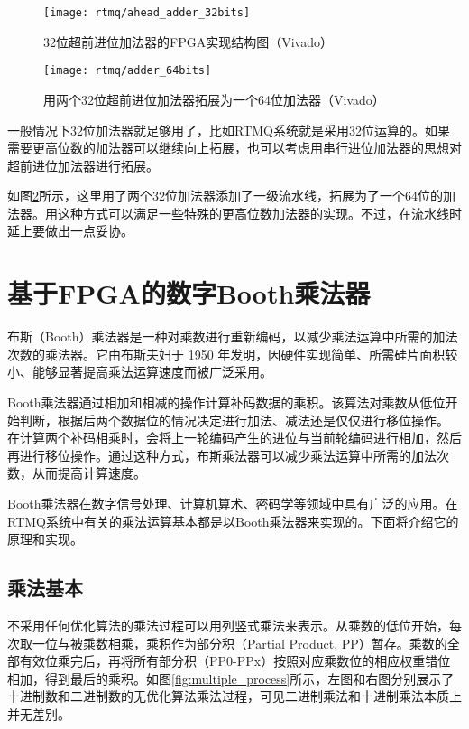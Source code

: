\begin{figure}
    \centering
    \caption[32位超前进位加法器的FPGA实现结构图]{32位超前进位加法器的FPGA实现结构图（Vivado）\label{fig:ahead_adder_32bits}}
    \texttt{[image: rtmq/ahead\_adder\_32bits]}
\end{figure}
\begin{figure}
    \centering
    \caption[用两个32位超前进位加法器拓展为一个64位加法器]{用两个32位超前进位加法器拓展为一个64位加法器（Vivado）\label{fig:adder_64bits}}
    \texttt{[image: rtmq/adder\_64bits]}
\end{figure}

一般情况下32位加法器就足够用了，比如RTMQ系统就是采用32位运算的。如果需要更高位数的加法器可以继续向上拓展，也可以考虑用串行进位加法器的思想对超前进位加法器进行拓展。

如图\ref{fig:adder_64bits}所示，这里用了两个32位加法器添加了一级流水线，拓展为了一个64位的加法器。用这种方式可以满足一些特殊的更高位数加法器的实现。不过，在流水线时延上要做出一点妥协。







\section[基于FPGA的数字Booth乘法器]{基于FPGA的数字Booth乘法器\label{section:booth_multiplier}}
布斯（Booth）乘法器是一种对乘数进行重新编码，以减少乘法运算中所需的加法次数的乘法器。它由布斯夫妇于 1950 年发明，因硬件实现简单、所需硅片面积较小、能够显著提高乘法运算速度而被广泛采用。

Booth乘法器通过相加和相减的操作计算补码数据的乘积。该算法对乘数从低位开始判断，根据后两个数据位的情况决定进行加法、减法还是仅仅进行移位操作。
在计算两个补码相乘时，会将上一轮编码产生的进位与当前轮编码进行相加，然后再进行移位操作。通过这种方式，布斯乘法器可以减少乘法运算中所需的加法次数，从而提高计算速度。

Booth乘法器在数字信号处理、计算机算术、密码学等领域中具有广泛的应用\cite[]{Jigjidsuren_Badarch_Sukhbaatar_Namsrai_2021}。在RTMQ系统中有关的乘法运算基本都是以Booth乘法器来实现的。下面将介绍它的原理和实现。

\subsection[乘法基本]{乘法基本}
不采用任何优化算法的乘法过程可以用列竖式乘法来表示。从乘数的低位开始，每次取一位与被乘数相乘，乘积作为部分积（Partial Product, PP）暂存。乘数的全部有效位乘完后，再将所有部分积（PP0-PPx）按照对应乘数位的相应权重错位相加，得到最后的乘积。如图\ref{fig:multiple_process}所示，左图和右图分别展示了十进制数和二进制数的无优化算法乘法过程，可见二进制乘法和十进制乘法本质上并无差别。

